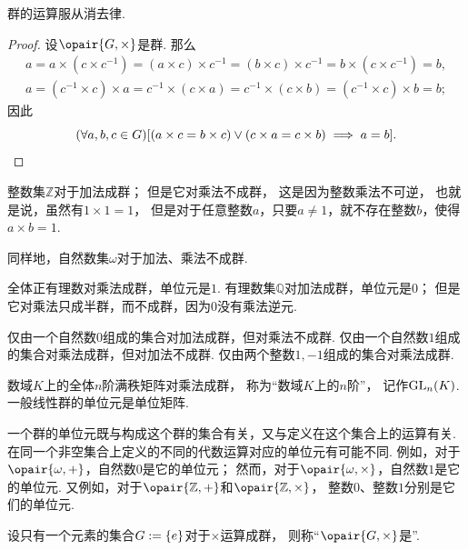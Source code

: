 \begin{theorem}\label{theorem:抽象代数.群的运算服从消去律}
群的运算服从消去律.
\begin{proof}
设\(\opair{G,\times}\)是群.
那么\begin{gather*}
	a=a\times(c\times c^{-1})
	=(a\times c)\times c^{-1}=(b\times c)\times c^{-1}
	=b\times(c\times c^{-1})
	=b, \\
	a=(c^{-1}\times c)\times a
	= c^{-1}\times(c\times a)
	= c^{-1}\times(c\times b)
	= (c^{-1}\times c)\times b
	= b;
\end{gather*}
因此\begin{equation*}
	(\forall a,b,c\in G)[
		(a\times c=b\times c)\lor(c\times a=c\times b) \implies a=b
	].
	\qedhere
\end{equation*}
\end{proof}
\end{theorem}

整数集\(\mathbb{Z}\)对于加法成群；
但是它对乘法不成群，
这是因为整数乘法不可逆，
也就是说，虽然有\(1\times1=1\)，
但是对于任意整数\(a\)，只要\(a\neq1\)，就不存在整数\(b\)，使得\(a \times b = 1\).

同样地，自然数集\(\omega\)对于加法、乘法不成群.

全体正有理数对乘法成群，单位元是\(1\).
有理数集\(\mathbb{Q}\)对加法成群，单位元是\(0\)；
但是它对乘法只成半群，而不成群，因为\(0\)没有乘法逆元.

仅由一个自然数\(0\)组成的集合对加法成群，但对乘法不成群.
仅由一个自然数\(1\)组成的集合对乘法成群，但对加法不成群.
仅由两个整数\(1,-1\)组成的集合对乘法成群.

数域\(K\)上的全体\(n\)阶满秩矩阵对乘法成群，
称为“数域\(K\)上的\(n\)阶”，
记作\(\operatorname{GL}_n(K)\).
一般线性群的单位元是单位矩阵.

一个群的单位元既与构成这个群的集合有关，又与定义在这个集合上的运算有关.
在同一个非空集合上定义的不同的代数运算对应的单位元有可能不同.
例如，对于\(\opair{\omega,+}\)，自然数\(0\)是它的单位元；
然而，对于\(\opair{\omega,\times}\)，自然数\(1\)是它的单位元.
又例如，对于\(\opair{\mathbb{Z},+}\)和\(\opair{\mathbb{Z},\times}\)，
整数\(0\)、整数\(1\)分别是它们的单位元.

\begin{definition}
设只有一个元素的集合\(G := \{e\}\)对于\(\times\)运算成群，
则称“\(\opair{G,\times}\)是”.
\end{definition}

